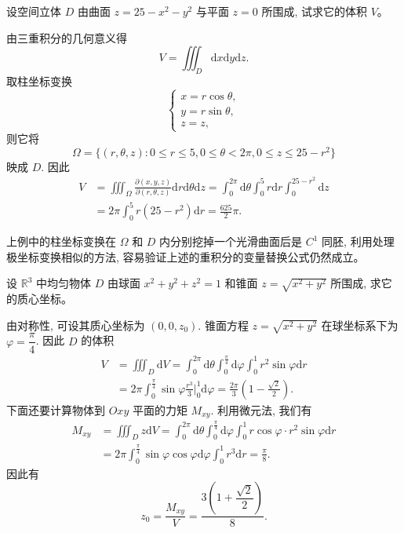 \documentclass[UTF8,12pt,a4paper,fontset=fandol]{ctexart}
\begin{document}
\begin{example}\label{course-example-15-4-6}\quad 设空间立体 $D$ 由曲面 $z=25-x^2-y^2$ 与平面 $z=0$ 所围成, 试求它的体积 $V$。

\end{example}
\begin{solve}\quad 由三重积分的几何意义得
\[
  V=\iiint_D\mathrm dx\mathrm dy\mathrm dz.
\]
取柱坐标变换
\[
  \begin{cases}
    x=r\cos\theta,\\
    y=r\sin\theta,\\
    z=z,
  \end{cases}
\]
则它将
\[
  \Omega=\{(r,\theta,z):0\leqslant r\leqslant5,0\leqslant\theta<2\pi,0\leqslant z\leqslant25-r^2\}
\]
映成 $D$. 因此
\[
\begin{aligned}
  V&=\iiint_\Omega\frac{\partial(x,y,z)}{\partial(r,\theta,z)}
  \mathrm dr\mathrm d\theta\mathrm dz
  =\int_0^{2\pi}\mathrm d\theta\int_0^5 r\mathrm dr\int_0^{25-r^2}\mathrm dz\\
  &=2\pi\int_0^5 r(25-r^2)\mathrm dr=\frac{625}2\pi.
\end{aligned}
\]

\end{solve}
\begin{remark}\quad 上例中的柱坐标变换在 $\Omega$ 和 $D$ 内分别挖掉一个光滑曲面后是 $C^1$ 同胚, 利用处理极坐标变换相似的方法, 容易验证上述的重积分的变量替换公式仍然成立。

\end{remark}
\begin{example}\label{course-example-15-4-7}\quad 设 $\mathbb R^3$ 中均匀物体 $D$ 由球面 $x^2+y^2+z^2=1$ 和锥面 $z=\sqrt{x^2+y^2}$ 所围成, 求它的质心坐标。

\end{example}
\begin{solve}\quad 由对称性, 可设其质心坐标为 $(0,0,z_0)$. 锥面方程 $z=\sqrt{x^2+y^2}$ 在球坐标系下为 $\varphi=\dfrac\pi4$. 因此 $D$ 的体积
\[
\begin{aligned}
  V&=\iiint_D\mathrm dV
  =\int_0^{2\pi}\mathrm d\theta\int_0^{\frac\pi4}\mathrm d\varphi\int_0^1 r^2\sin\varphi\mathrm dr\\
  &=2\pi\int_0^{\frac\pi4}\sin\varphi\frac{r^3}3\Big|_0^1\mathrm d\varphi
  =\frac{2\pi}3\left(1-\frac{\sqrt2}2\right).
\end{aligned}
\]
下面还要计算物体到 $Oxy$ 平面的力矩 $M_{xy}$. 利用微元法, 我们有
\[
\begin{aligned}
  M_{xy}&=\iiint_D z\mathrm dV
  =\int_0^{2\pi}\mathrm d\theta\int_0^{\frac\pi4}\mathrm d\varphi\int_0^1
  r\cos\varphi\cdot r^2\sin\varphi\mathrm dr\\
  &=2\pi\int_0^{\frac\pi4}\sin\varphi\cos\varphi\mathrm d\varphi\int_0^1r^3\mathrm dr
  =\frac\pi8.
\end{aligned}
\]
因此有
\[
  z_0=\frac{M_{xy}}V=\frac{3\left(1+\dfrac{\sqrt2}2\right)}8.
\]

\end{solve}
\end{document}
